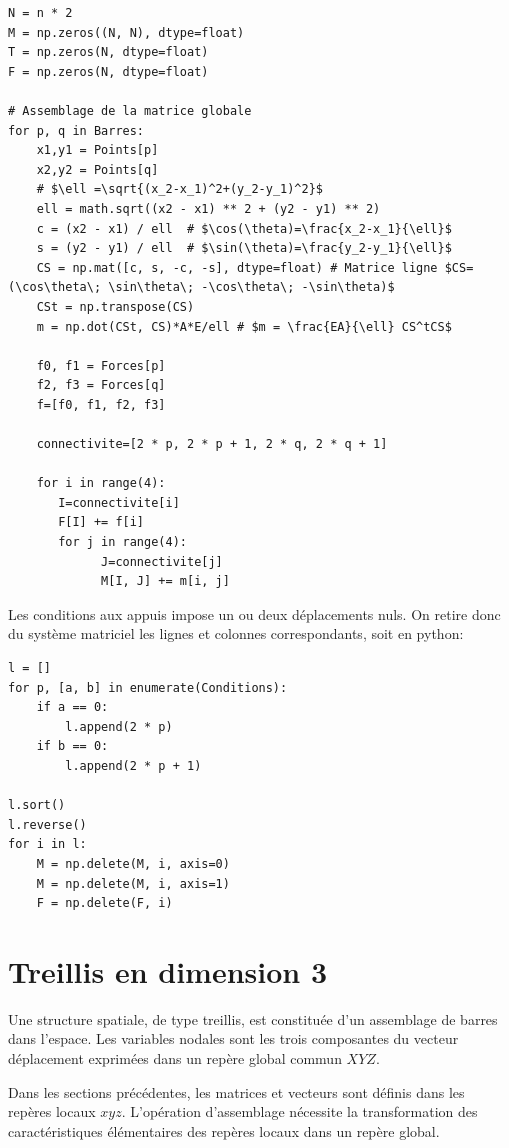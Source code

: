 \documentclass[a4paper]{article}
\begin{document}
\begin{verbatim}
N = n * 2
M = np.zeros((N, N), dtype=float)
T = np.zeros(N, dtype=float)
F = np.zeros(N, dtype=float) 

# Assemblage de la matrice globale
for p, q in Barres:
    x1,y1 = Points[p]
    x2,y2 = Points[q]
    # $\ell =\sqrt{(x_2-x_1)^2+(y_2-y_1)^2}$
    ell = math.sqrt((x2 - x1) ** 2 + (y2 - y1) ** 2)
    c = (x2 - x1) / ell  # $\cos(\theta)=\frac{x_2-x_1}{\ell}$
    s = (y2 - y1) / ell  # $\sin(\theta)=\frac{y_2-y_1}{\ell}$
    CS = np.mat([c, s, -c, -s], dtype=float) # Matrice ligne $CS=(\cos\theta\; \sin\theta\; -\cos\theta\; -\sin\theta)$
    CSt = np.transpose(CS)
    m = np.dot(CSt, CS)*A*E/ell # $m = \frac{EA}{\ell} CS^tCS$
    
    f0, f1 = Forces[p]
    f2, f3 = Forces[q]
    f=[f0, f1, f2, f3]
    
    connectivite=[2 * p, 2 * p + 1, 2 * q, 2 * q + 1]
    
    for i in range(4):
       I=connectivite[i]
       F[I] += f[i]
       for j in range(4):
             J=connectivite[j]
             M[I, J] += m[i, j]
\end{verbatim}
Les conditions aux appuis impose un ou deux déplacements nuls. On retire donc du système matriciel  les lignes et colonnes correspondants, soit en python:

\begin{verbatim}
l = []
for p, [a, b] in enumerate(Conditions):
    if a == 0:
        l.append(2 * p)
    if b == 0:
        l.append(2 * p + 1)

l.sort()
l.reverse()
for i in l:
    M = np.delete(M, i, axis=0)
    M = np.delete(M, i, axis=1)
    F = np.delete(F, i)
\end{verbatim}

 
 
 \section{Treillis en dimension 3}
 Une structure spatiale, de type treillis, est constituée d'un assemblage de barres dans l'espace. Les variables nodales sont les trois composantes du vecteur déplacement exprimées dans un repère global commun $XYZ$.
 
 Dans les sections précédentes, les matrices et vecteurs sont définis dans les repères locaux $xyz$. L'opération d'assemblage nécessite la transformation des caractéristiques élémentaires des repères locaux dans un repère global.
 
\end{document}
